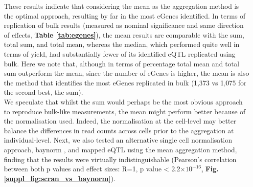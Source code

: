 
These results indicate that considering the mean as the aggregation method is the optimal approach, resulting by far in the most eGenes identified.
In terms of replication of bulk results (measured as nominal significance and same direction of effects, \textbf{Table \ref{tab:egenes}}), the mean results are comparable with the sum, total sum, and total mean, whereas the median, which performed quite well in terms of yield, had substantially fewer of its identified eQTL replicated using bulk. 
Here we note that, although in terms of percentage total mean and total sum outperform the mean, since the number of eGenes is higher, the mean is also the method that identifies the most eGenes replicated in bulk (1,373 vs 1,075 for the second best, the sum). \\

We speculate that whilst the sum would perhaps be the most obvious approach to reproduce bulk-like measurements, the mean might perform better because of the normalisation used.
Indeed, the normalisation at the cell-level may better balance the differences in read counts across cells prior to the aggregation at individual-level. 
Next, we also tested an alternative single cell normalisation approach, baynorm \cite{tang2020baynorm}, and mapped eQTL using the mean aggregation method, finding that the results were virtually indistinguishable (Pearson's correlation between both p values and effect sizes: R=1, p value < 2.2$\times 10^{-16}$, \textbf{Fig. \ref{suppl_fig:scran_vs_baynorm}}). \\

